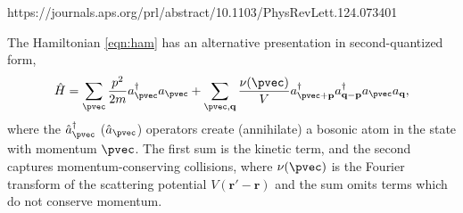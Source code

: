 {{{{{{    https://journals.aps.org/prl/abstract/10.1103/PhysRevLett.124.073401 




The Hamiltonian \ref{eqn:ham} has an alternative presentation in second-quantized form,
	\begin{equation}
		\hat{H} = \sum_\pvec \frac{p^2}{2m} a^\dagger_\pvec a_\pvec +\sum_{\pvec,\textbf{q}} \frac{\nu(\pvec)}{V}a^\dagger_{\pvec+\textbf{p}} a^\dagger_{\textbf{q}-\textbf{p}} a_\pvec a_\textbf{q}, 
	\end{equation}
	where the $\hat{a}^\dagger_\pvec$  ($\hat{a}_\pvec$) operators create (annihilate) a bosonic atom in the state with momentum $\pvec$. The first sum is the kinetic term, and the second captures momentum-conserving collisions, where $\nu(\pvec)$ is the Fourier transform of the scattering potential $V(\textbf{r}'-\textbf{r})$ and the sum omits terms which do not conserve momentum. 

}}}}}}
